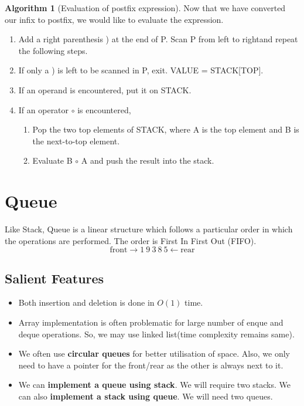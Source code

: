 \documentclass[10pt, a4paper]{extarticle}
\theoremstyle{definition}
\newtheorem{alg}{Algorithm}
\begin{document}
	\begin{alg}[Evaluation of postfix expression]
		Now that we have converted our infix to postfix, we would like to evaluate the expression.
		\begin{enumerate}
			\item Add a right parenthesis ) at the end of P. Scan P from left to rightand repeat the following steps.
			\item If only a ) is left to be scanned in P, exit. VALUE = STACK[TOP].
			\item If an operand is encountered, put it on STACK.
			\item If an operator $\circ$ is encountered,
				\begin{enumerate}
					\item Pop the two top elements of STACK, where A is the top element and B is the next-to-top element.
					\item Evaluate B $\circ$ A and push the result into the stack.

			\end{enumerate}
	\end{enumerate}
	\end{alg}
	

	\section{Queue}
	Like Stack, Queue is a linear structure which follows a particular order in which the operations are performed. The order is First In First Out (FIFO).
	\[\boxed{\text{front}}\to1\ 9\ 3\ 8\ 5\leftarrow\boxed{\text{rear}}\]

	\subsection{Salient Features}
	\begin{itemize}
		\item Both insertion and deletion is done in $O(1)$ time.
		\item Array implementation is often problematic for large number of enque and deque operations. So, we may use linked list(time complexity remains same).
		\item We often use \textbf{circular queues} for better utilisation of space. Also, we only need to have a pointer for the front/rear as the other is always next to it.
		\item We can \textbf{implement a queue using stack}. We will require two stacks. We can also \textbf{implement a stack using queue}. We will need two queues.
	\end{itemize}
\end{document}
